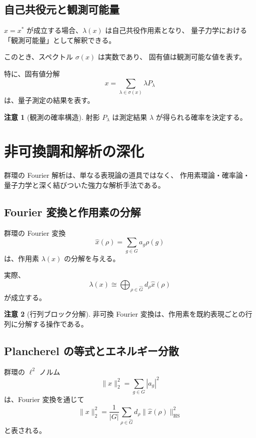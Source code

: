 \documentclass[12pt,a4paper]{ltjarticle}
\theoremstyle{definition}
\newtheorem*{remark}{注意}
\begin{document}
\subsection{自己共役元と観測可能量}

$x = x^*$ が成立する場合、$\lambda(x)$ は自己共役作用素となり、
量子力学における「観測可能量」として解釈できる。

このとき、スペクトル $\sigma(x)$ は実数であり、
固有値は観測可能な値を表す。

特に、固有値分解
\[
x = \sum_{\lambda \in \sigma(x)} \lambda P_\lambda
\]
は、量子測定の結果を表す。

\begin{remark}[観測の確率構造]
射影 $P_\lambda$ は測定結果 $\lambda$ が得られる確率を決定する。
\end{remark}

\section{非可換調和解析の深化}

群環の Fourier 解析は、単なる表現論の道具ではなく、
作用素環論・確率論・量子力学と深く結びついた強力な解析手法である。

\subsection{Fourier 変換と作用素の分解}

群環の Fourier 変換
\[
\widehat{x}(\rho) = \sum_{g \in G} a_g \rho(g)
\]
は、作用素 $\lambda(x)$ の分解を与える。

実際、
\[
\lambda(x) \cong \bigoplus_{\rho \in \widehat{G}} d_\rho \widehat{x}(\rho)
\]
が成立する。

\begin{remark}[行列ブロック分解]
非可換 Fourier 変換は、作用素を既約表現ごとの行列に分解する操作である。
\end{remark}

\subsection{Plancherel の等式とエネルギー分散}

群環の $\ell^2$ ノルム
\[
\|x\|_2^2 = \sum_{g \in G} |a_g|^2
\]
は、Fourier 変換を通じて
\[
\|x\|_2^2 = \frac{1}{|G|} \sum_{\rho \in \widehat{G}} d_\rho \|\widehat{x}(\rho)\|_{\mathrm{HS}}^2
\]
と表される。
\end{document}
